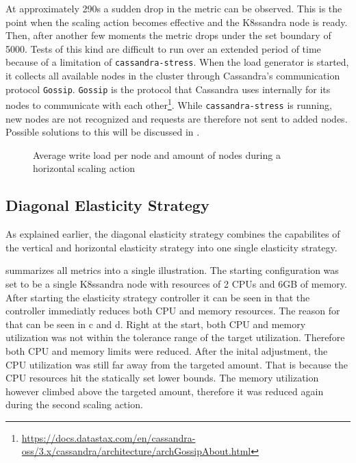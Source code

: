 At approximately 290s a sudden drop in the metric can be observed. This is the point when the scaling action becomes effective and the K8ssandra node is ready. Then, after another few moments the metric drops under the set boundary of 5000. Tests of this kind are difficult to run over an extended period of time because of a limitation of \texttt{cassandra-stress}. When the load generator is started, it collects all available nodes in the cluster through Cassandra's communication protocol \texttt{Gossip}. \texttt{Gossip} is the protocol that Cassandra uses internally for its nodes to communicate with each other\footnote{\raggedright\url{https://docs.datastax.com/en/cassandra-oss/3.x/cassandra/architecture/archGossipAbout.html}}. While \texttt{cassandra-stress} is running, new nodes are not recognized and requests are therefore not sent to added nodes. Possible solutions to this will be discussed in .

\begin{figure}
    \centering
    
    \caption{Average write load per node and amount of nodes during a horizontal scaling action}
    \label{fig:horizontal-elasticity}
\end{figure}

\subsection{Diagonal Elasticity Strategy}

As explained earlier, the diagonal elasticity strategy combines the capabilites of the vertical and horizontal elasticity strategy into one single elasticity strategy.

 summarizes all metrics into a single illustration. The starting configuration was set to be a single K8ssandra node with resources of 2 CPUs and 6GB of memory. After starting the elasticity strategy controller it can be seen in  that the controller immediatly reduces both CPU and memory resources. The reason for that can be seen in c and d. Right at the start, both CPU and memory utilization was not within the tolerance range of the target utilization. Therefore both CPU and memory limits were reduced. After the inital adjustment, the CPU utilization was still far away from the targeted amount. That is because the CPU resources hit the statically set lower bounds. The memory utilization however climbed above the targeted amount, therefore it was reduced again during the second scaling action.


